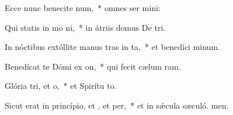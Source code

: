 \item Ecce nunc benecite num,~* omnes ser mini:
\item Qui statis in mo ni,~* in átriis domus De tri.
\item In nóctibus extóllite manus tras in ta,~* et benedíci minum.
\item Benedícat te Dómi ex on,~* qui fecit cælum  ram.
\item Glória tri, et o,~* et Spirítu to.
\item Sicut erat in princípio, et , et per,~* et in sǽcula sæculó. men.
